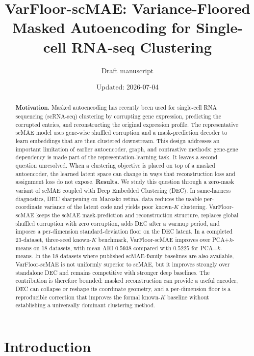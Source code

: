 \documentclass[11pt]{article}
\title{VarFloor-scMAE: Variance-Floored Masked Autoencoding for Single-cell RNA-seq Clustering}
\author{Draft manuscript}
\date{Updated: 2026-07-04}
\begin{document}
\maketitle

\begin{abstract}
\textbf{Motivation.}
Masked autoencoding has recently been used for single-cell RNA sequencing (scRNA-seq) clustering by corrupting gene expression, predicting the corrupted entries, and reconstructing the original expression profile. The representative scMAE model uses gene-wise shuffled corruption and a mask-prediction decoder to learn embeddings that are then clustered downstream. This design addresses an important limitation of earlier autoencoder, graph, and contrastive methods: gene-gene dependency is made part of the representation-learning task. It leaves a second question unresolved. When a clustering objective is placed on top of a masked autoencoder, the learned latent space can change in ways that reconstruction loss and assignment loss do not expose.
\textbf{Results.}
We study this question through a zero-mask variant of scMAE coupled with Deep Embedded Clustering (DEC). In same-harness diagnostics, DEC sharpening on Macosko retinal data reduces the usable per-coordinate variance of the latent code and yields poor known-$K$ clustering. VarFloor-scMAE keeps the scMAE mask-prediction and reconstruction structure, replaces global shuffled corruption with zero corruption, adds DEC after a warmup period, and imposes a per-dimension standard-deviation floor on the DEC latent. In a completed 23-dataset, three-seed known-$K$ benchmark, VarFloor-scMAE improves over PCA+$k$-means on 18 datasets, with mean ARI $0.5938$ compared with $0.5225$ for PCA+$k$-means. In the 18 datasets where published scMAE-family baselines are also available, VarFloor-scMAE is not uniformly superior to scMAE, but it improves strongly over standalone DEC and remains competitive with stronger deep baselines. The contribution is therefore bounded: masked reconstruction can provide a useful encoder, DEC can collapse or reshape its coordinate geometry, and a per-dimension floor is a reproducible correction that improves the formal known-$K$ baseline without establishing a universally dominant clustering method.
\end{abstract}

\section{Introduction}
\end{document}
